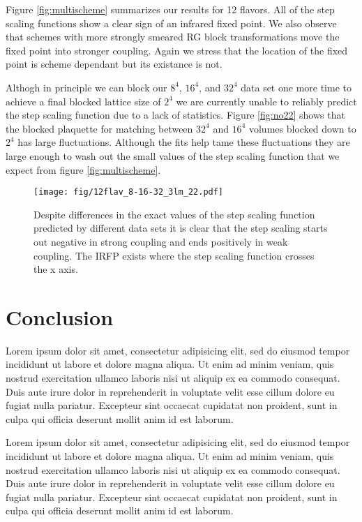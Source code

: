 \documentclass{PoS}
\begin{document}
Figure \ref{fig:multischeme} summarizes our results for 12 flavors.
All of the step scaling functions show a clear sign of an infrared fixed point.
We also observe that schemes with more strongly smeared RG block transformations move the fixed point into stronger coupling.
Again we stress that the location of the fixed point is scheme dependant but its existance is not.

Althogh in principle we can block our  $8^4$, $16^4$, and $32^4$ data set one more time to achieve a final blocked lattice size of $2^4$ we are currently unable to reliably predict the step scaling function due to a lack of statistics.
Figure \ref{fig:no22} shows that the blocked plaquette for matching between $32^4$ and $16^4$ volumes blocked down to $2^4$ has large fluctuations.
Although the fits help tame these fluctuations they are large enough to wash out the small values of the step scaling function that we expect from figure \ref{fig:multischeme}.

\begin{figure}[th]
  \centering
  \texttt{[image: fig/12flav\_8-16-32\_3lm\_22.pdf]}
  \caption{Despite differences in the exact values of the step scaling function predicted by different data sets it is clear that the step scaling starts out negative in strong coupling and ends positively in weak coupling.  The IRFP exists where the step scaling function crosses the x axis.}
  \label{fig:scheme7}
\end{figure}

\section{Conclusion}
\label{sec:conclusion}
Lorem ipsum dolor sit amet, consectetur adipisicing elit, sed do eiusmod tempor incididunt ut labore et dolore magna aliqua.
Ut enim ad minim veniam, quis nostrud exercitation ullamco laboris nisi ut aliquip ex ea commodo consequat.
Duis aute irure dolor in reprehenderit in voluptate velit esse cillum dolore eu fugiat nulla pariatur.
Excepteur sint occaecat cupidatat non proident, sunt in culpa qui officia deserunt mollit anim id est laborum.

Lorem ipsum dolor sit amet, consectetur adipisicing elit, sed do eiusmod tempor incididunt ut labore et dolore magna aliqua.
Ut enim ad minim veniam, quis nostrud exercitation ullamco laboris nisi ut aliquip ex ea commodo consequat.
Duis aute irure dolor in reprehenderit in voluptate velit esse cillum dolore eu fugiat nulla pariatur.
Excepteur sint occaecat cupidatat non proident, sunt in culpa qui officia deserunt mollit anim id est laborum.
\end{document}
